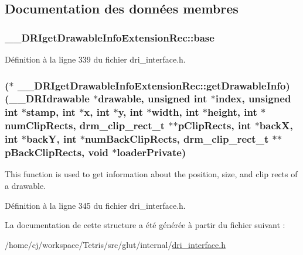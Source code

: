 \subsection{Documentation des données membres}
\hypertarget{struct_____d_r_iget_drawable_info_extension_rec_a11af234206e5eb72327421399c8adb7a}{
\subsubsection[{base}]{ \-\_\-\-\_\-\-D\-R\-Iget\-Drawable\-Info\-Extension\-Rec\-::base}}\label{struct_____d_r_iget_drawable_info_extension_rec_a11af234206e5eb72327421399c8adb7a}


Définition à la ligne 339 du fichier dri\-\_\-interface.\-h.

\hypertarget{struct_____d_r_iget_drawable_info_extension_rec_ad238025cff673579d60b63f8fd572562}{
\subsubsection[{get\-Drawable\-Info}]{($\ast$  \-\_\-\-\_\-\-D\-R\-Iget\-Drawable\-Info\-Extension\-Rec\-::get\-Drawable\-Info)({\bf \-\_\-\-\_\-\-D\-R\-Idrawable} $\ast$drawable, unsigned int $\ast${\bf index}, unsigned int $\ast$stamp, int $\ast${\bf x}, int $\ast${\bf y}, int $\ast${\bf width}, int $\ast${\bf height}, int $\ast$num\-Clip\-Rects, drm\-\_\-clip\-\_\-rect\-\_\-t $\ast$$\ast$p\-Clip\-Rects, int $\ast$back\-X, int $\ast$back\-Y, int $\ast$num\-Back\-Clip\-Rects, drm\-\_\-clip\-\_\-rect\-\_\-t $\ast$$\ast$p\-Back\-Clip\-Rects, {\bf void} $\ast$loader\-Private)}}\label{struct_____d_r_iget_drawable_info_extension_rec_ad238025cff673579d60b63f8fd572562}
This function is used to get information about the position, size, and clip rects of a drawable. 

Définition à la ligne 345 du fichier dri\-\_\-interface.\-h.



La documentation de cette structure a été générée à partir du fichier suivant \-:\begin{DoxyCompactItemize}
\item 
/home/cj/workspace/\-Tetris/src/glut/internal/\hyperlink{dri__interface_8h}{dri\-\_\-interface.\-h}\end{DoxyCompactItemize}
